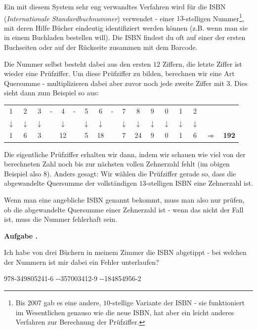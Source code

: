 \documentclass[a4paper,ngerman,12pt]{scrartcl}
\theoremstyle{definition}
\theoremstyle{plain}
\theoremstyle{remark}
\newlength{\aufgabenskip}
\newcounter{aufgabennummer}
\newenvironment{aufgabe}[1]{
	\addtocounter{aufgabennummer}{1}
	\textbf{Aufgabe \theaufgabennummer.} \emph{#1} \par
}{\vspace{\aufgabenskip}}
\begin{document}
Ein mit diesem System sehr eng verwandtes Verfahren wird für die ISBN (\emph{Internationale Standardbuchnummer}) verwendet - einer $13$-stelligen Nummer\footnote{Bis 2007 gab es eine andere, $10$-stellige Variante der ISBN - sie funktioniert im Wesentlichen genauso wie die neue ISBN, hat aber ein leicht anderes Verfahren zur Berechnung der Prüfziffer.}, mit deren Hilfe Bücher eindeutig identifiziert werden können (z.B. wenn man sie in einem Buchladen bestellen will). Die ISBN findest du oft auf einer der ersten Buchseiten oder auf der Rückseite zusammen mit dem Barcode.

Die Nummer selbst besteht dabei aus den ersten $12$ Ziffern, die letzte Ziffer ist wieder eine Prüfziffer. Um diese Prüfziffer zu bilden, berechnen wir eine Art Quersumme - multiplizieren dabei aber zuvor noch jede zweite Ziffer mit $3$. Dies sieht dann zum Beispiel so aus:

\begin{center}
	\begin{tabular}{ccccccccccccccccc}
		1 & 2 & 3 & - & 4 & - & 5 & 6 & - & 7 & 8 & 9 & 0 & 1 & 2 & & \\
		$\downarrow$ & $\downarrow$ & $\downarrow$ & & $\downarrow$ & & $\downarrow$ & $\downarrow$ & & $\downarrow$ & $\downarrow$ & $\downarrow$ & $\downarrow$ & $\downarrow$ & $\downarrow$ & & \\
		1 & 6 & 3 & & 12 & & 5 & 18 & & 7 & 24 & 9 & 0 & 1 & 6 & $\Rightarrow$ & \textbf{192}
	\end{tabular}
\end{center}

Die eigentliche Prüfziffer erhalten wir dann, indem wir schauen wie viel von der berechneten Zahl noch bis zur nächsten vollen Zehnerzahl fehlt (im obigen Beispiel also $8$). Anders gesagt: Wir wählen die Prüfziffer gerade so, dass die abgewandelte Quersumme der vollständigen $13$-stelligen ISBN eine Zehnerzahl ist. 

Wenn man eine angebliche ISBN genannt bekommt, muss man also nur prüfen, ob die abgewandelte Quersumme einer Zehnerzahl ist - wenn das nicht der Fall ist, muss die Nummer fehlerhaft sein.

\begin{aufgabe}{}
	Ich habe von drei Büchern in meinem Zimmer die ISBN abgetippt - bei welchen der Nummern ist mir dabei ein Fehler unterlaufen?
	\begin{center}
		978-349805241-6 \quad--357003412-9 \quad--184854956-2
	\end{center}
\end{aufgabe}
\end{document}
